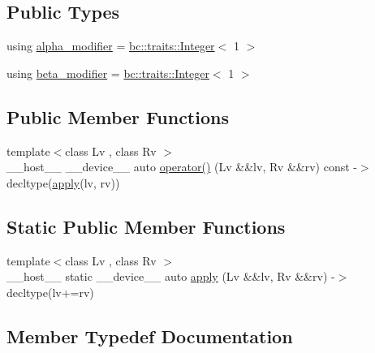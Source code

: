 \subsection*{Public Types}
\begin{DoxyCompactItemize}
\item 
using \hyperlink{structbc_1_1oper_1_1Alias__Add__Assign_a7a509d5fb7acf8ab6d89dd07c7cdb833}{alpha\+\_\+modifier} = \hyperlink{structbc_1_1traits_1_1Integer}{bc\+::traits\+::\+Integer}$<$ 1 $>$
\item 
using \hyperlink{structbc_1_1oper_1_1Alias__Add__Assign_a5eb213fdd8f2e901e50e86157b438c69}{beta\+\_\+modifier} = \hyperlink{structbc_1_1traits_1_1Integer}{bc\+::traits\+::\+Integer}$<$ 1 $>$
\end{DoxyCompactItemize}
\subsection*{Public Member Functions}
\begin{DoxyCompactItemize}
\item 
{\footnotesize template$<$class Lv , class Rv $>$ }\\\+\_\+\+\_\+host\+\_\+\+\_\+ \+\_\+\+\_\+device\+\_\+\+\_\+ auto \hyperlink{structbc_1_1oper_1_1Alias__Add__Assign_a9c4d04d195e67d0954492766740f4774}{operator()} (Lv \&\&lv, Rv \&\&rv) const -\/$>$ decltype(\hyperlink{structbc_1_1oper_1_1Alias__Add__Assign_ada0a058271a4a854408a2eb86c1bb2e1}{apply}(lv, rv))
\end{DoxyCompactItemize}
\subsection*{Static Public Member Functions}
\begin{DoxyCompactItemize}
\item 
{\footnotesize template$<$class Lv , class Rv $>$ }\\\+\_\+\+\_\+host\+\_\+\+\_\+ static \+\_\+\+\_\+device\+\_\+\+\_\+ auto \hyperlink{structbc_1_1oper_1_1Alias__Add__Assign_ada0a058271a4a854408a2eb86c1bb2e1}{apply} (Lv \&\&lv, Rv \&\&rv) -\/$>$ decltype(lv+=rv)
\end{DoxyCompactItemize}


\subsection{Member Typedef Documentation}
\mbox{\label{structbc_1_1oper_1_1Alias__Add__Assign_a7a509d5fb7acf8ab6d89dd07c7cdb833}} 
